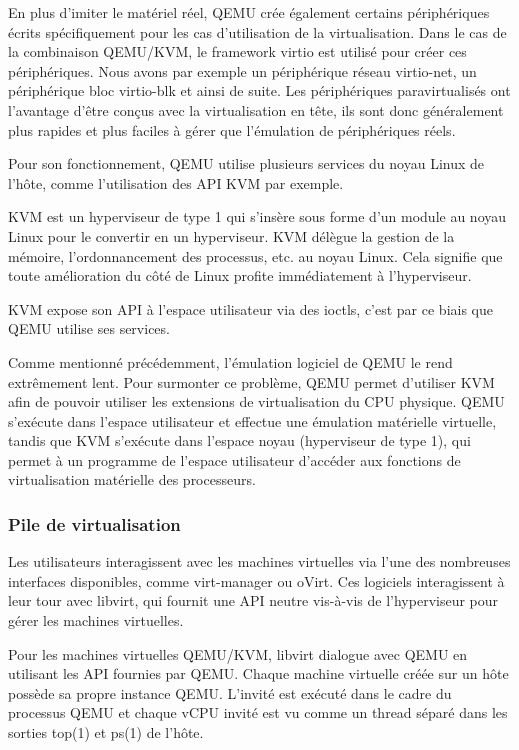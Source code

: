 En plus d'imiter le matériel réel, QEMU crée également certains périphériques écrits spécifiquement pour les cas d'utilisation de la virtualisation.
Dans le cas de la combinaison QEMU/KVM, le framework virtio est utilisé pour créer ces périphériques.
Nous avons par exemple un périphérique réseau virtio-net, un périphérique bloc virtio-blk et ainsi de suite.
Les périphériques paravirtualisés ont l'avantage d'être conçus avec la virtualisation en tête, ils sont donc généralement plus rapides et plus faciles à gérer que l'émulation de périphériques réels.

Pour son fonctionnement, QEMU utilise plusieurs services du noyau Linux de l'hôte, comme l'utilisation des API KVM par exemple.

KVM est un hyperviseur de type 1 qui s'insère sous forme d'un module au noyau Linux pour le convertir en un hyperviseur.
KVM délègue la gestion de la mémoire, l'ordonnancement des processus, etc. au noyau Linux.
Cela signifie que toute amélioration du côté de Linux profite immédiatement à l'hyperviseur.

KVM expose son API à l'espace utilisateur via des ioctls, c'est par ce biais que QEMU utilise ses services.

Comme mentionné précédemment, l'émulation logiciel de QEMU le rend extrêmement lent. 
Pour surmonter ce problème, QEMU permet d'utiliser KVM afin de pouvoir utiliser les extensions de virtualisation du CPU physique.
QEMU s'exécute dans l'espace utilisateur et effectue une émulation matérielle virtuelle, tandis que KVM s'exécute dans l'espace noyau (hyperviseur de type 1), qui permet à un programme de l'espace utilisateur d'accéder aux fonctions de virtualisation matérielle des processeurs.


\subsubsection{Pile de virtualisation}
Les utilisateurs interagissent avec les machines virtuelles via l'une des nombreuses interfaces disponibles, comme virt-manager ou oVirt.
Ces logiciels interagissent à leur tour avec libvirt, qui fournit une API neutre vis-à-vis de l'hyperviseur pour gérer les machines virtuelles.

Pour les machines virtuelles QEMU/KVM, libvirt dialogue avec QEMU en utilisant les API fournies par QEMU.
Chaque machine virtuelle créée sur un hôte possède sa propre instance QEMU.
L'invité est exécuté dans le cadre du processus QEMU et chaque vCPU invité est vu comme un thread séparé dans les sorties top(1) et ps(1) de l'hôte.

